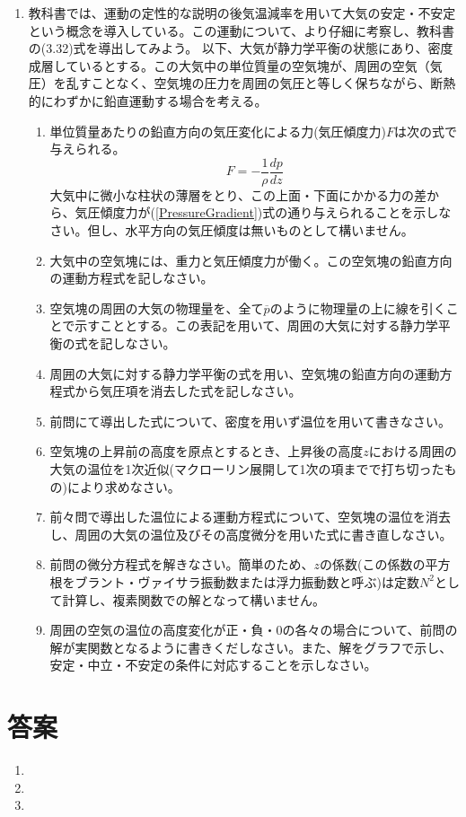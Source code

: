 \documentclass{jsarticle}
\newenvironment{problems}
{
  \renewcommand\labelenumi{\doublebox{\arabic{enumi}}}
  \begin{enumerate}
}{
  \end{enumerate}
  \renewcommand\labelenumi{\arabic{enumi}.}
}
\begin{document}
\begin{problems}
    \item 教科書では、運動の定性的な説明の後気温減率を用いて大気の安定・不安定という概念を導入している。この運動について、より仔細に考察し、教科書の(3.32)式を導出してみよう。
        以下、大気が静力学平衡の状態にあり、密度成層しているとする。この大気中の単位質量の空気塊が、周囲の空気（気圧）を乱すことなく、空気塊の圧力を周囲の気圧と等しく保ちながら、断熱的にわずかに鉛直運動する場合を考える。
        \begin{enumerate}[(1)]
        \item 単位質量あたりの鉛直方向の気圧変化による力(気圧傾度力)$F$は次の式で与えられる。
        \begin{equation}
            F=-\frac{1}{\rho}\frac{dp}{dz} \label{PressureGradient}
        \end{equation}
        大気中に微小な柱状の薄層をとり、この上面・下面にかかる力の差から、気圧傾度力が(\ref{PressureGradient})式の通り与えられることを示しなさい。但し、水平方向の気圧傾度は無いものとして構いません。
        \item 大気中の空気塊には、重力と気圧傾度力が働く。この空気塊の鉛直方向の運動方程式を記しなさい。
        \item 空気塊の周囲の大気の物理量を、全て$\overline{p}$のように物理量の上に線を引くことで示すこととする。この表記を用いて、周囲の大気に対する静力学平衡の式を記しなさい。
        \item 周囲の大気に対する静力学平衡の式を用い、空気塊の鉛直方向の運動方程式から気圧項を消去した式を記しなさい。
        \item 前問にて導出した式について、密度を用いず温位を用いて書きなさい。
        \item 空気塊の上昇前の高度を原点とするとき、上昇後の高度$z$における周囲の大気の温位を1次近似(マクローリン展開して1次の項までで打ち切ったもの)により求めなさい。
        \item 前々問で導出した温位による運動方程式について、空気塊の温位を消去し、周囲の大気の温位及びその高度微分を用いた式に書き直しなさい。
        \item 前問の微分方程式を解きなさい。簡単のため、$z$の係数(この係数の平方根をブラント・ヴァイサラ振動数または浮力振動数と呼ぶ)は定数$N^2$として計算し、複素関数での解となって構いません。
        \item 周囲の空気の温位の高度変化が正・負・0の各々の場合について、前問の解が実関数となるように書きくだしなさい。また、解をグラフで示し、安定・中立・不安定の条件に対応することを示しなさい。
        \end{enumerate}

\end{problems}

\section{答案}
\begin{problems}
\item 

\item 

\item 

\end{problems}
\end{document}

